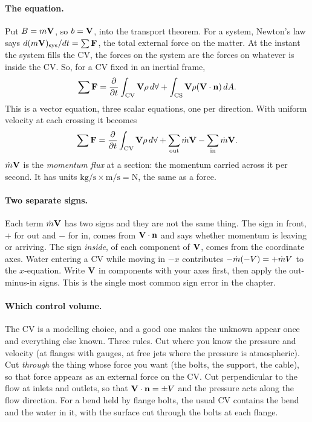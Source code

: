 \paragraph{The equation.} Put $B = m\mathbf{V}$, so $b = \mathbf{V}$, into the transport theorem. For a system, Newton's law says $d(m\mathbf{V})_\text{sys}/dt = \sum\mathbf{F}$, the total external force on the matter. At the instant the system fills the CV, the forces on the system are the forces on whatever is inside the CV. So, for a CV fixed in an inertial frame,
\[
\sum\mathbf{F} = \frac{\partial }{\partial t}\int_\text{CV}\mathbf{V}\rho\,d\forall + \int_\text{CS}\mathbf{V}\rho(\mathbf{V}\cdot\mathbf{n})\,dA .
\]
This is a vector equation, three scalar equations, one per direction. With uniform velocity at each crossing it becomes
\[
\sum\mathbf{F} = \frac{\partial }{\partial t}\int_\text{CV}\mathbf{V}\rho\,d\forall + \sum_\text{out}\dot m\mathbf{V} - \sum_\text{in}\dot m\mathbf{V} .
\]
$\dot m\mathbf{V}$ is the \emph{momentum flux} at a section: the momentum carried across it per second. It has units $\mathrm{kg/s}\times\mathrm{m/s} = \mathrm N$, the same as a force.

\paragraph{Two separate signs.} Each term $\dot m\mathbf{V}$ has two signs and they are not the same thing. The sign in front, $+$ for out and $-$ for in, comes from $\mathbf{V}\cdot\mathbf{n}$ and says whether momentum is leaving or arriving. The sign \emph{inside}, of each component of $\mathbf{V}$, comes from the coordinate axes. Water entering a CV while moving in $-x$ contributes $-\dot m(-V) = +\dot m V$ to the $x$-equation. Write $\mathbf{V}$ in components with your axes first, then apply the out-minus-in signs. This is the single most common sign error in the chapter.

\paragraph{Which control volume.} The CV is a modelling choice, and a good one makes the unknown appear once and everything else known. Three rules. Cut where you know the pressure and velocity (at flanges with gauges, at free jets where the pressure is atmospheric). Cut \emph{through} the thing whose force you want (the bolts, the support, the cable), so that force appears as an external force on the CV. Cut perpendicular to the flow at inlets and outlets, so that $\mathbf{V}\cdot\mathbf{n} = \pm V$ and the pressure acts along the flow direction. For a bend held by flange bolts, the usual CV contains the bend and the water in it, with the surface cut through the bolts at each flange.


